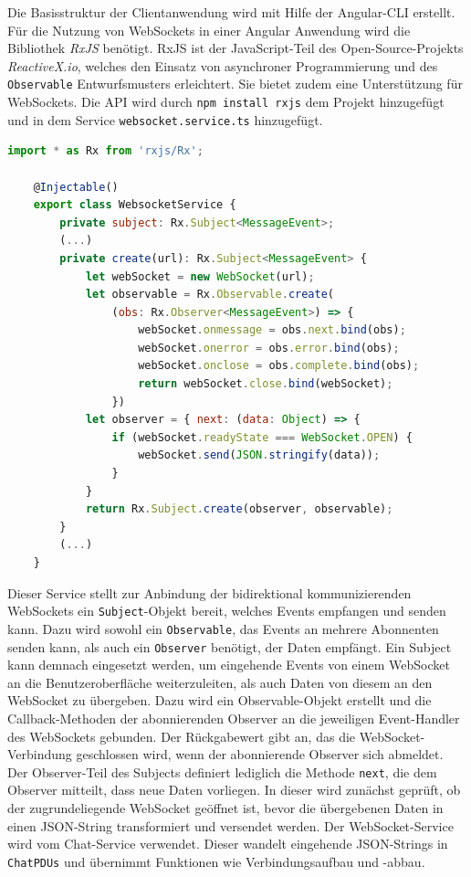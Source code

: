 \documentclass[11pt,a4paper,titlepage]{scrartcl}
\numberwithin{equation}{section}
\begin{document}
\noindent Die Basisstruktur der Clientanwendung wird mit Hilfe der Angular-CLI erstellt. Für die Nutzung von WebSockets in einer Angular Anwendung wird die Bibliothek \textit{RxJS} benötigt. RxJS ist der JavaScript-Teil des Open-Source-Projekts \textit{ReactiveX.io}, welches den Einsatz von asynchroner Programmierung und des \texttt{Observable} Entwurfsmusters erleichtert. Sie bietet zudem eine Unterstützung für WebSockets. Die API wird durch \texttt{npm install rxjs} dem Projekt hinzugefügt und in dem Service \texttt{websocket.service.ts} hinzugefügt.\medskip

\begin{lstlisting}[frame=single, language=JavaScript, caption=WebSocket-Client: WebSocket-Service, label=lst:wsClientWS]
	import * as Rx from 'rxjs/Rx';

	@Injectable()
	export class WebsocketService {
		private subject: Rx.Subject<MessageEvent>;
		(...)
		private create(url): Rx.Subject<MessageEvent> {
			let webSocket = new WebSocket(url);
			let observable = Rx.Observable.create(
				(obs: Rx.Observer<MessageEvent>) => {
					webSocket.onmessage = obs.next.bind(obs);
					webSocket.onerror = obs.error.bind(obs);
					webSocket.onclose = obs.complete.bind(obs);
					return webSocket.close.bind(webSocket);
				})
			let observer = { next: (data: Object) => {
				if (webSocket.readyState === WebSocket.OPEN) {
					webSocket.send(JSON.stringify(data));
				}
			}
			return Rx.Subject.create(observer, observable);
		} 
		(...)
	}
\end{lstlisting}

\noindent Dieser Service stellt zur Anbindung der bidirektional kommunizierenden WebSockets ein \texttt{Subject}-Objekt bereit, welches Events empfangen und senden kann. Dazu wird sowohl ein \texttt{Observable}, das Events an mehrere Abonnenten senden kann, als auch ein \texttt{Observer} benötigt, der Daten empfängt. Ein Subject kann demnach eingesetzt werden, um eingehende Events von einem WebSocket an die Benutzeroberfläche weiterzuleiten, als auch Daten von diesem an den WebSocket zu übergeben. Dazu wird ein Observable-Objekt erstellt und die Callback-Methoden der abonnierenden Observer an die jeweiligen Event-Handler des WebSockets gebunden. Der Rückgabewert gibt an, das die WebSocket-Verbindung geschlossen wird, wenn der abonnierende Observer sich abmeldet. Der Observer-Teil des Subjects definiert lediglich die Methode \texttt{next}, die dem Observer mitteilt, dass neue Daten vorliegen. In dieser wird zunächst geprüft, ob der zugrundeliegende WebSocket geöffnet ist, bevor die übergebenen Daten in einen JSON-String transformiert und versendet werden. Der WebSocket-Service wird vom Chat-Service verwendet. Dieser wandelt eingehende JSON-Strings in \texttt{ChatPDUs} und übernimmt Funktionen wie Verbindungsaufbau und -abbau.
\end{document}
